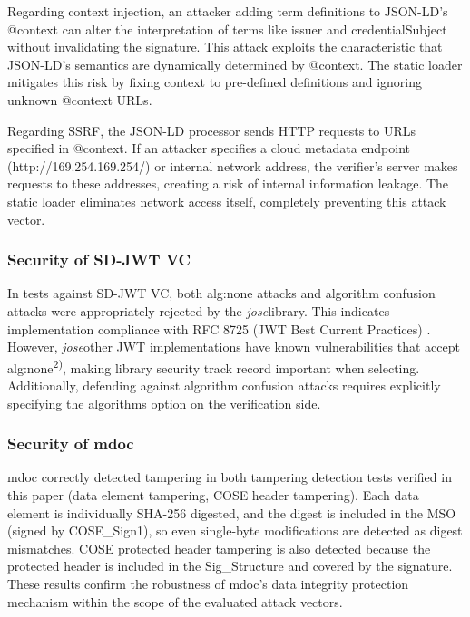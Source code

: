 \documentclass[conference]{IEEEtran}
\begin{document}
Regarding context injection, an attacker adding term definitions to JSON-LD's @context can alter the interpretation of terms like issuer and credentialSubject without invalidating the signature. This attack exploits the characteristic that JSON-LD's semantics are dynamically determined by @context. The static loader mitigates this risk by fixing context to pre-defined definitions and ignoring unknown @context URLs.

Regarding SSRF, the JSON-LD processor sends HTTP requests to URLs specified in @context. If an attacker specifies a cloud metadata endpoint (http://169.254.169.254/) or internal network address, the verifier's server makes requests to these addresses, creating a risk of internal information leakage. The static loader eliminates network access itself, completely preventing this attack vector.

\subsubsection{Security of SD-JWT VC}

In tests against SD-JWT VC, both alg:none attacks and algorithm confusion attacks were appropriately rejected by the \emph{jose}library. This indicates implementation compliance with RFC 8725 (JWT Best Current Practices) \cite{ref5}. However, \emph{jose}other JWT implementations have known vulnerabilities that accept alg:none\textsuperscript{2)}, making library security track record important when selecting. Additionally, defending against algorithm confusion attacks requires explicitly specifying the algorithms option on the verification side.

\subsubsection{Security of mdoc}

mdoc correctly detected tampering in both tampering detection tests verified in this paper (data element tampering, COSE header tampering). Each data element is individually SHA-256 digested, and the digest is included in the MSO (signed by COSE\_Sign1), so even single-byte modifications are detected as digest mismatches. COSE protected header tampering is also detected because the protected header is included in the Sig\_Structure and covered by the signature. These results confirm the robustness of mdoc's data integrity protection mechanism within the scope of the evaluated attack vectors.
\end{document}
